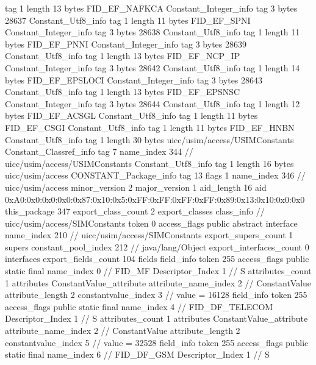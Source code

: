 {{{			tag	1
			length	13
			bytes	FID_EF_NAFKCA
		}
		Constant_Integer_info {
			tag	3
			bytes	28637
		}
		Constant_Utf8_info {
			tag	1
			length	11
			bytes	FID_EF_SPNI
		}
		Constant_Integer_info {
			tag	3
			bytes	28638
		}
		Constant_Utf8_info {
			tag	1
			length	11
			bytes	FID_EF_PNNI
		}
		Constant_Integer_info {
			tag	3
			bytes	28639
		}
		Constant_Utf8_info {
			tag	1
			length	13
			bytes	FID_EF_NCP_IP
		}
		Constant_Integer_info {
			tag	3
			bytes	28642
		}
		Constant_Utf8_info {
			tag	1
			length	14
			bytes	FID_EF_EPSLOCI
		}
		Constant_Integer_info {
			tag	3
			bytes	28643
		}
		Constant_Utf8_info {
			tag	1
			length	13
			bytes	FID_EF_EPSNSC
		}
		Constant_Integer_info {
			tag	3
			bytes	28644
		}
		Constant_Utf8_info {
			tag	1
			length	12
			bytes	FID_EF_ACSGL
		}
		Constant_Utf8_info {
			tag	1
			length	11
			bytes	FID_EF_CSGI
		}
		Constant_Utf8_info {
			tag	1
			length	11
			bytes	FID_EF_HNBN
		}
		Constant_Utf8_info {
			tag	1
			length	30
			bytes	uicc/usim/access/USIMConstants
		}
		Constant_Classref_info {
			tag	7
			name_index	344		// uicc/usim/access/USIMConstants
		}
		Constant_Utf8_info {
			tag	1
			length	16
			bytes	uicc/usim/access
		}
		CONSTANT_Package_info {
			tag	13
			flags	1
			name_index	346		// uicc/usim/access
			minor_version	2
			major_version	1
			aid_length	16
			aid	0xA0:0x0:0x0:0x0:0x87:0x10:0x5:0xFF:0xFF:0xFF:0xFF:0x89:0x13:0x10:0x0:0x0
		}
	}
	this_package	347
	export_class_count	2
	export_classes {
		class_info {		// uicc/usim/access/SIMConstants
			token	0
			access_flags	public abstract interface
			name_index	210		// uicc/usim/access/SIMConstants
			export_supers_count	1
			supers {
				constant_pool_index	212		// java/lang/Object
			}
			export_interfaces_count	0
			interfaces {
			}
			export_fields_count	104
			fields {
			field_info {
				token	255
				access_flags	public static final
				name_index	0		// FID_MF
				Descriptor_Index	1		// S
				attributes_count	1
				attributes {
				ConstantValue_attribute {
					attribute_name_index	2		// ConstantValue
					attribute_length	2
					constantvalue_index	3		// value = 16128
				}
				}
			}
			field_info {
				token	255
				access_flags	public static final
				name_index	4		// FID_DF_TELECOM
				Descriptor_Index	1		// S
				attributes_count	1
				attributes {
				ConstantValue_attribute {
					attribute_name_index	2		// ConstantValue
					attribute_length	2
					constantvalue_index	5		// value = 32528
				}
				}
			}
			field_info {
				token	255
				access_flags	public static final
				name_index	6		// FID_DF_GSM
				Descriptor_Index	1		// S
}}}}}
